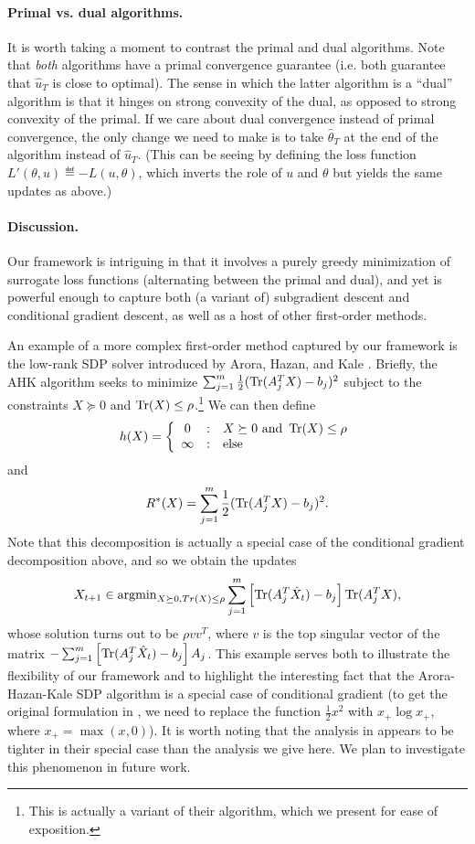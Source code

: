\documentclass{article} %
\begin{document}
\paragraph{Primal vs. dual algorithms.}
It is worth taking a moment to contrast the primal and dual algorithms. Note 
that \emph{both} algorithms have a primal convergence guarantee (i.e. both 
guarantee that $\hat{u}_T$ is close to optimal). The sense in which the latter 
algorithm is a ``dual'' algorithm is that it hinges on strong convexity of 
the dual, as opposed to strong convexity of the primal. If we care about dual 
convergence instead of primal convergence, the only change we need to make 
is to take $\hat{\theta}_T$ at the end of the algorithm instead of $\hat{u}_T$. 
(This can be seeing by defining the loss function $L'(\theta, u) \eqdef -L(u, \theta)$, 
which inverts the role of $u$ and $\theta$ but yields the same updates as above.)

\paragraph{Discussion.}
Our framework is intriguing in that it involves a purely greedy minimization 
of surrogate loss functions (alternating between the primal and dual), and yet 
is powerful enough to capture both (a variant of) subgradient descent and 
conditional gradient descent, as well as a host of other first-order methods. 

An example of a more complex first-order method captured by our framework is 
the low-rank SDP solver introduced by Arora, Hazan, and Kale \cite{aroraSDP}. 
Briefly, the AHK algorithm seeks to minimize 
$\sum_{j=1}^m \frac{1}{2}(\operatorname{Tr}(A_j^TX)-b_j)^2$ subject to the 
constraints $X \succeq 0$ and $\operatorname{Tr}(X) \leq \rho$.\footnote{This is actually a 
variant of their algorithm, which we present for ease of exposition.} We 
can then define 
\[ h(X) = \left\{ \begin{array}{ccl} 0 & : & X \succeq 0\mathrm{ \ and \ }\operatorname{Tr}(X) \leq \rho \\ \infty & : & \mathrm{else} \end{array} \right.\]
and
\[ R^*(X) = \sum_{j=1}^m \frac{1}{2}(\operatorname{Tr}(A_j^TX)-b_j)^2. \]
Note that this decomposition is actually a special case of the conditional 
gradient decomposition above, and so we obtain the updates 
\[ X_{t+1} \in \operatorname{argmin}_{X \succeq 0, Tr(X) \leq \rho} \sum_{j=1}^m \left[\operatorname{Tr}(A_j^T\hat{X}_t)-b_j\right]\operatorname{Tr}(A_j^TX), \]
whose solution turns out to be $\rho vv^T$, where $v$ is the top singular 
vector of the matrix
$-\sum_{j=1}^m \left[\operatorname{Tr}(A_j^T\hat{X}_t)-b_j\right]A_j$. This example serves both 
to illustrate the flexibility of our framework and to highlight the interesting 
fact that the Arora-Hazan-Kale SDP algorithm is a special case of conditional 
gradient (to get the original formulation in \cite{aroraSDP}, we need to replace 
the function $\frac{1}{2}x^2$ with $x_{+}\log x_{+}$, where $x_{+} = \max(x,0)$). 
It is worth noting that the analysis in \cite{aroraSDP} appears to be tighter in 
their special case than the analysis we give here. We plan to investigate this 
phenomenon in future work.
\end{document}
